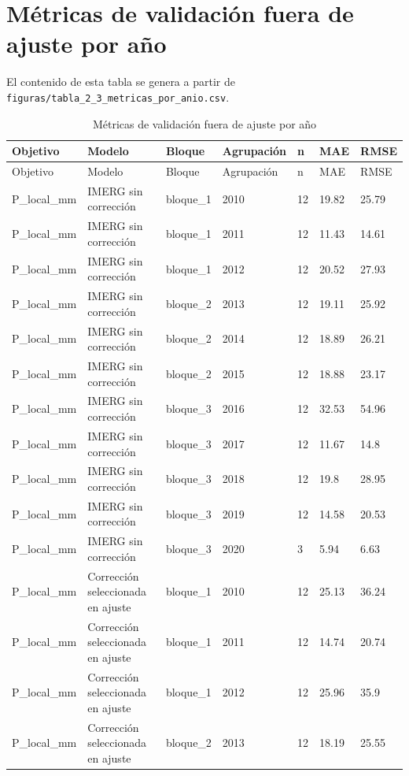 \section{Métricas de validación fuera de ajuste por año}
El contenido de esta tabla se genera a partir de \texttt{figuras/tabla_2_3_metricas_por_anio.csv}.

\begin{longtable}{lllllll}
\caption{Métricas de validación fuera de ajuste por año}\\
\toprule
Objetivo & Modelo & Bloque & Agrupación & n & MAE & RMSE \\
\midrule
\endfirsthead
\toprule
Objetivo & Modelo & Bloque & Agrupación & n & MAE & RMSE \\
\midrule
\endhead
\bottomrule
\endfoot
P\_local\_mm & IMERG sin corrección & bloque\_1 & 2010 & 12 & 19.82 & 25.79 \\
P\_local\_mm & IMERG sin corrección & bloque\_1 & 2011 & 12 & 11.43 & 14.61 \\
P\_local\_mm & IMERG sin corrección & bloque\_1 & 2012 & 12 & 20.52 & 27.93 \\
P\_local\_mm & IMERG sin corrección & bloque\_2 & 2013 & 12 & 19.11 & 25.92 \\
P\_local\_mm & IMERG sin corrección & bloque\_2 & 2014 & 12 & 18.89 & 26.21 \\
P\_local\_mm & IMERG sin corrección & bloque\_2 & 2015 & 12 & 18.88 & 23.17 \\
P\_local\_mm & IMERG sin corrección & bloque\_3 & 2016 & 12 & 32.53 & 54.96 \\
P\_local\_mm & IMERG sin corrección & bloque\_3 & 2017 & 12 & 11.67 & 14.8 \\
P\_local\_mm & IMERG sin corrección & bloque\_3 & 2018 & 12 & 19.8 & 28.95 \\
P\_local\_mm & IMERG sin corrección & bloque\_3 & 2019 & 12 & 14.58 & 20.53 \\
P\_local\_mm & IMERG sin corrección & bloque\_3 & 2020 & 3 & 5.94 & 6.63 \\
P\_local\_mm & Corrección seleccionada en ajuste & bloque\_1 & 2010 & 12 & 25.13 & 36.24 \\
P\_local\_mm & Corrección seleccionada en ajuste & bloque\_1 & 2011 & 12 & 14.74 & 20.74 \\
P\_local\_mm & Corrección seleccionada en ajuste & bloque\_1 & 2012 & 12 & 25.96 & 35.9 \\
P\_local\_mm & Corrección seleccionada en ajuste & bloque\_2 & 2013 & 12 & 18.19 & 25.55 \\

\end{longtable}
